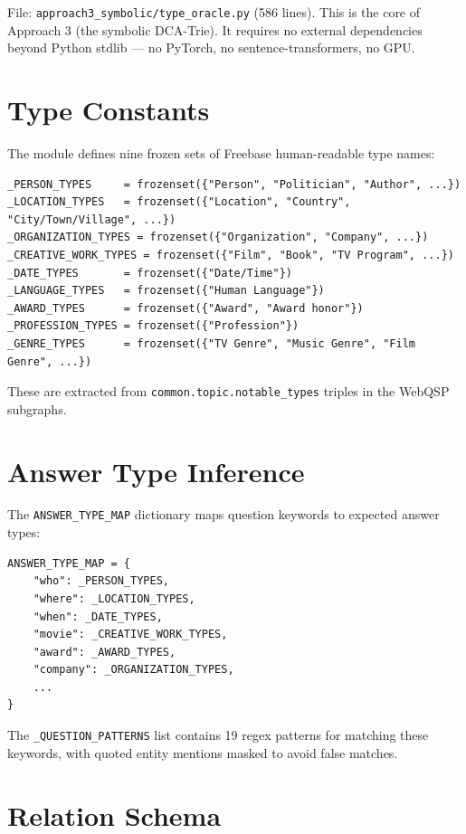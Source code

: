 \documentclass[11pt,a4paper,oneside,openany]{book}
\theoremstyle{definition}
\newcommand{\code}[1]{\texttt{#1}}
\newcommand{\file}[1]{\texttt{#1}}
\begin{document}
File: \file{approach3\_symbolic/type\_oracle.py} (586 lines). This is the core of Approach 3 (the symbolic DCA-Trie). It requires no external dependencies beyond Python stdlib --- no PyTorch, no sentence-transformers, no GPU.

\section{Type Constants}

The module defines nine frozen sets of Freebase human-readable type names:

\begin{lstlisting}
_PERSON_TYPES     = frozenset({"Person", "Politician", "Author", ...})
_LOCATION_TYPES   = frozenset({"Location", "Country", "City/Town/Village", ...})
_ORGANIZATION_TYPES = frozenset({"Organization", "Company", ...})
_CREATIVE_WORK_TYPES = frozenset({"Film", "Book", "TV Program", ...})
_DATE_TYPES       = frozenset({"Date/Time"})
_LANGUAGE_TYPES   = frozenset({"Human Language"})
_AWARD_TYPES      = frozenset({"Award", "Award honor"})
_PROFESSION_TYPES = frozenset({"Profession"})
_GENRE_TYPES      = frozenset({"TV Genre", "Music Genre", "Film Genre", ...})
\end{lstlisting}

These are extracted from \code{common.topic.notable\_types} triples in the WebQSP subgraphs.

\section{Answer Type Inference}

The \code{ANSWER\_TYPE\_MAP} dictionary maps question keywords to expected answer types:

\begin{lstlisting}
ANSWER_TYPE_MAP = {
    "who": _PERSON_TYPES,
    "where": _LOCATION_TYPES,
    "when": _DATE_TYPES,
    "movie": _CREATIVE_WORK_TYPES,
    "award": _AWARD_TYPES,
    "company": _ORGANIZATION_TYPES,
    ...
}
\end{lstlisting}

The \code{\_QUESTION\_PATTERNS} list contains 19 regex patterns for matching these keywords, with quoted entity mentions masked to avoid false matches.

\section{Relation Schema}
\end{document}
